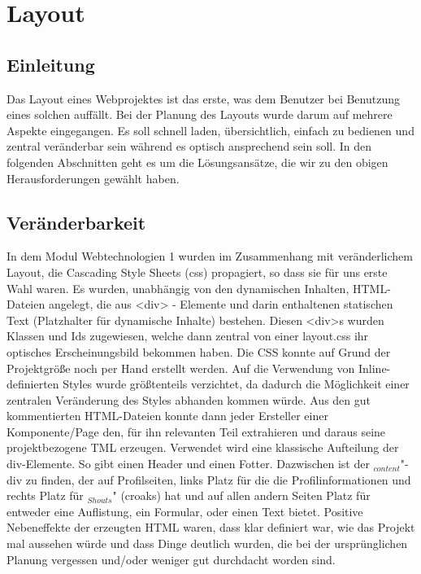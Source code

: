 \documentclass[12pt,a4paper]{article}
\begin{document}
\newpage
\section{Layout}
\subsection{Einleitung}
Das Layout eines Webprojektes ist das erste, was dem Benutzer bei Benutzung eines solchen auffällt. Bei der Planung des Layouts wurde darum auf mehrere Aspekte eingegangen. Es soll schnell laden, übersichtlich, einfach zu bedienen und zentral veränderbar sein während es
optisch ansprechend sein soll. In den folgenden Abschnitten geht es um die Lösungsansätze, die wir zu den obigen Herausforderungen gewählt haben.

\subsection{Veränderbarkeit}
In dem Modul Webtechnologien 1 wurden im Zusammenhang mit veränderlichem Layout, die Cascading Style Sheets (css) propagiert, so dass sie für uns erste Wahl waren. Es wurden, unabhängig von den dynamischen Inhalten, HTML-Dateien angelegt, die aus <div> - Elemente und darin enthaltenen statischen Text (Platzhalter für dynamische Inhalte) bestehen. Diesen <div>s wurden Klassen und Ids zugewiesen, welche dann zentral von einer layout.css ihr optisches Erscheinungsbild bekommen haben. Die CSS konnte auf Grund der Projektgröße noch per Hand erstellt werden. Auf die Verwendung von Inline-definierten Styles wurde größtenteils verzichtet, da dadurch die Möglichkeit einer zentralen Veränderung des Styles abhanden kommen würde. 
Aus den gut kommentierten HTML-Dateien konnte dann jeder Ersteller einer Komponente/Page den, für ihn relevanten Teil extrahieren und daraus seine projektbezogene TML erzeugen. Verwendet wird eine klassische Aufteilung der div-Elemente. So gibt einen Header und einen Fotter. Dazwischen ist der 
$_{content}$"-
div zu finden, der auf Profilseiten, links Platz für die 
die Profilinformationen und rechts Platz für $_{Shouts}$"
(croaks) hat und auf allen andern Seiten Platz für entweder eine Auflistung, ein Formular, oder einen Text bietet. Positive Nebeneffekte der erzeugten HTML waren, dass klar definiert war, wie das Projekt mal aussehen würde und dass Dinge deutlich wurden, die bei der ursprünglichen Planung vergessen und/oder weniger gut durchdacht worden sind.
  
\end{document}
